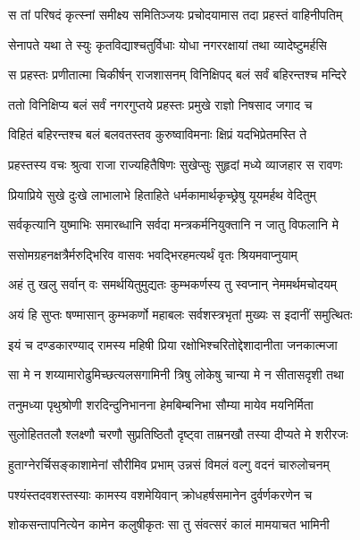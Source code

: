 
\twolineshloka
{स तां परिषदं कृत्स्नां समीक्ष्य समितिञ्जयः}
{प्रचोदयामास तदा प्रहस्तं वाहिनीपतिम्} %

\twolineshloka
{सेनापते यथा ते स्युः कृतविद्याश्चतुर्विधाः}
{योधा नगररक्षायां तथा व्यादेष्टुमर्हसि} %

\twolineshloka
{स प्रहस्तः प्रणीतात्मा चिकीर्षन् राजशासनम्}
{विनिक्षिपद् बलं सर्वं बहिरन्तश्च मन्दिरे} %

\twolineshloka
{ततो विनिक्षिप्य बलं सर्वं नगरगुप्तये}
{प्रहस्तः प्रमुखे राज्ञो निषसाद जगाद च} %

\twolineshloka
{विहितं बहिरन्तश्च बलं बलवतस्तव}
{कुरुष्वाविमनाः क्षिप्रं यदभिप्रेतमस्ति ते} %

\twolineshloka
{प्रहस्तस्य वचः श्रुत्वा राजा राज्यहितैषिणः}
{सुखेप्सुः सुहृदां मध्ये व्याजहार स रावणः} %

\twolineshloka
{प्रियाप्रिये सुखे दुःखे लाभालाभे हिताहिते}
{धर्मकामार्थकृच्छ्रेषु यूयमर्हथ वेदितुम्} %

\twolineshloka
{सर्वकृत्यानि युष्माभिः समारब्धानि सर्वदा}
{मन्त्रकर्मनियुक्तानि न जातु विफलानि मे} %

\twolineshloka
{ससोमग्रहनक्षत्रैर्मरुद्भिरिव वासवः}
{भवद्भिरहमत्यर्थं वृतः श्रियमवाप्नुयाम्} %

\twolineshloka
{अहं तु खलु सर्वान् वः समर्थयितुमुद्यतः}
{कुम्भकर्णस्य तु स्वप्नान् नेममर्थमचोदयम्} %

\twolineshloka
{अयं हि सुप्तः षण्मासान् कुम्भकर्णो महाबलः}
{सर्वशस्त्रभृतां मुख्यः स इदानीं समुत्थितः} %

\twolineshloka
{इयं च दण्डकारण्याद् रामस्य महिषी प्रिया}
{रक्षोभिश्चरितोद्देशादानीता जनकात्मजा} %

\twolineshloka
{सा मे न शय्यामारोढुमिच्छत्यलसगामिनी}
{त्रिषु लोकेषु चान्या मे न सीतासदृशी तथा} %

\twolineshloka
{तनुमध्या पृथुश्रोणी शरदिन्दुनिभानना}
{हेमबिम्बनिभा सौम्या मायेव मयनिर्मिता} %

\twolineshloka
{सुलोहिततलौ श्लक्ष्णौ चरणौ सुप्रतिष्ठितौ}
{दृष्ट्वा ताम्रनखौ तस्या दीप्यते मे शरीरजः} %

\twolineshloka
{हुताग्नेरर्चिसङ्काशामेनां सौरीमिव प्रभाम्}
{उन्नसं विमलं वल्गु वदनं चारुलोचनम्} %

\twolineshloka
{पश्यंस्तदवशस्तस्याः कामस्य वशमेयिवान्}
{क्रोधहर्षसमानेन दुर्वर्णकरणेन च} %

\twolineshloka
{शोकसन्तापनित्येन कामेन कलुषीकृतः}
{सा तु संवत्सरं कालं मामयाचत भामिनी} %

